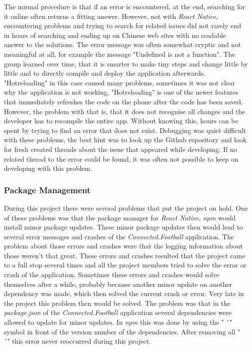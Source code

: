  The normal procedure is that if an error is encountered, at the end, searching for it online often returns a fitting answer. However, not with \textit{React Native}, encountering problems and trying to search for related issues did not rarely end in hours of searching and ending up on Chinese web sites with no readable answer to the solutions. The error message was often somewhat cryptic and not meaningful at all, for example the message "Undefined is not a function". The group learned over time, that it is smarter to make tiny steps and change little by little and to directly compile and deploy the application afterwards. "Hotreloading" in this case caused many problems, sometimes it was not clear why the application is not working, "Hotreloading" is one of the newer features that immediately refreshes the code on the phone after the code has been saved. However, the problem with that is, that it does not recognise all changes and the developer has to recompile the entire app. Without knowing this, hours can be spent by trying to find an error that does not exist.
 \newline
 Debugging was quiet difficult with these problems, the best hint was to look up the Github repository and look for fresh created threads about the issue that appeared while developing. If no related thread to the error could be found, it was often not possible to keep on developing with this problem.

\subsubsection{Package Management}
\label{sssec:package_management}

During this project there were several problems that put the project on hold. One of these problems was that the package manager for \textit{React Native}, \textit{npm} would install minor package updates. These minor package updates then would lead to several error messages and crashes of the \textit{Connected.Football} application. The problem about those errors and crashes were that the logging information about those weren't that great. These errors and crashes resulted that the project came to a full stop several times and all the project members tried to solve the error or crash of the application. 
\newline
Sometimes these errors and crashes would solve themselves after a while, probably because another minor update on another dependency was made, which then solved the current crash or error. 
\newline
Very late in the project this problem then would be solved. The problem was that in the \textit{package.json} of the \textit{Connected.Football} application several dependencies were allowed to update for minor updates. In \textit{npm} this was done by using the " \^\ " symbol in front of the version number of the dependencies. After removing all " \^\ " this error never reoccurred during this project. 

